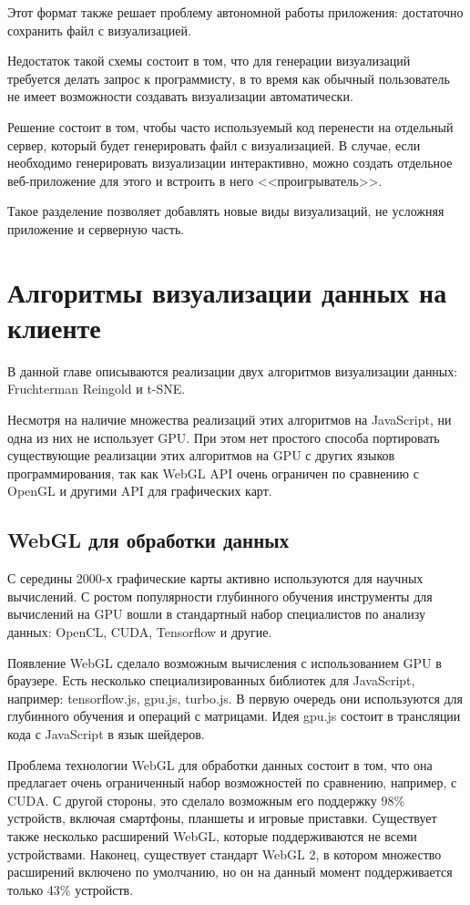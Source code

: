Этот формат также решает проблему автономной работы приложения: достаточно сохранить файл с визуализацией.

Недостаток такой схемы состоит в том, что для генерации визуализаций требуется делать запрос к программисту, в то время как обычный пользователь не имеет возможности создавать визуализации автоматически.

Решение состоит в том, чтобы часто используемый код перенести на отдельный сервер, который будет генерировать файл с визуализацией. В случае, если необходимо генерировать визуализации интерактивно, можно создать отдельное веб-приложение для этого и встроить в него <<проигрыватель>>.

Такое разделение позволяет добавлять новые виды визуализаций, не усложняя приложение и серверную часть.

\chapter{Алгоритмы визуализации данных на клиенте}

В данной главе описываются реализации двух алгоритмов визуализации данных: Fruchterman Reingold и t-SNE.

Несмотря на наличие множества реализаций этих алгоритмов на JavaScript, ни одна из них не использует GPU. При этом нет простого способа портировать существующие реализации этих алгоритмов на GPU с других языков программирования, так как WebGL API очень ограничен по сравнению с OpenGL и другими API для графических карт.

\section{WebGL для обработки данных}
\label{sec:webgl_data_analysis}

С середины 2000-х графические карты активно используются для научных вычислений. С ростом популярности глубинного обучения инструменты для вычислений на GPU вошли в стандартный набор специалистов по анализу данных: OpenCL, CUDA, Tensorflow и другие.

Появление WebGL сделало возможным вычисления с использованием GPU в браузере. Есть несколько специализированных библиотек для JavaScript, например: tensorflow.js, gpu.js, turbo.js. В первую очередь они используются для глубинного обучения и операций с матрицами. Идея gpu.js состоит в трансляции кода с JavaScript в язык шейдеров.

Проблема технологии WebGL для обработки данных состоит в том, что она предлагает очень ограниченный набор возможностей по сравнению, например, с CUDA. С другой стороны, это сделало возможным его поддержку 98\% устройств, включая смартфоны, планшеты и игровые приставки. Существует также несколько расширений WebGL, которые поддерживаются не всеми устройствами. Наконец, существует стандарт WebGL 2, в котором множество расширений включено по умолчанию, но он на данный момент поддерживается только 43\% устройств.

